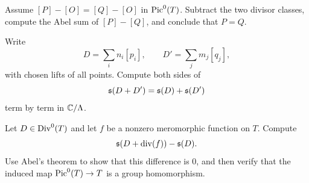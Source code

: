 \begin{exercise}
Assume \([P]-[O]=[Q]-[O]\) in \(\operatorname{Pic}^0(T)\).  Subtract the two divisor classes,
compute the Abel sum of \([P]-[Q]\), and conclude that \(P=Q\).
\end{exercise}

\begin{exercise}
Write
\[
  D=\sum_i n_i[p_i],\qquad D'=\sum_j m_j[q_j],
\]
with chosen lifts of all points.  Compute both sides of
\[
  \mathfrak{s}(D+D')=\mathfrak{s}(D)+\mathfrak{s}(D')
\]
term by term in \(\mathbb{C}/\Lambda\).
\end{exercise}

\begin{exercise}
Let \(D\in\operatorname{Div}^0(T)\) and let \(f\) be a nonzero meromorphic function on \(T\).
Compute
\[
  \mathfrak{s}(D+\operatorname{div}(f))-\mathfrak{s}(D).
\]
Use Abel's theorem to show that this difference is \(0\), and then verify that
the induced map \(\operatorname{Pic}^0(T)\to T\) is a group homomorphism.
\end{exercise}
